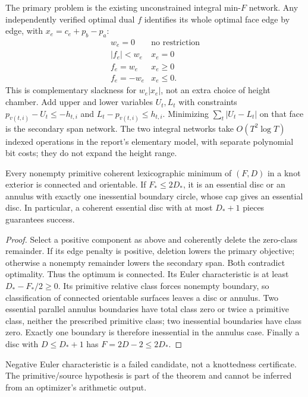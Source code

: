 The primary problem is the existing unconstrained integral min-$F$
network. Any independently verified optimal dual $f$ identifies its whole
optimal face edge by edge, with $x_e=c_e+p_b-p_a$:
\[
 \begin{array}{c|c}
 w_e=0&\text{no restriction}\\
 |f_e|<w_e&x_e=0\\
 f_e=w_e&x_e\ge0\\
 f_e=-w_e&x_e\le0.
 \end{array}
\]
This is complementary slackness for $w_e|x_e|$, not an extra choice of
height chamber. Add upper and lower variables $U_t,L_t$ with constraints
$p_{v(t,i)}-U_t\le-h_{t,i}$ and
$L_t-p_{v(t,i)}\le h_{t,i}$. Minimizing $\sum_t|U_t-L_t|$ on that
face is the secondary span network. The two integral networks take
$O(T^2\log T)$ indexed operations in the report's elementary model, with
separate polynomial bit costs; they do not expand the height range.

\begin{proposition}
Every nonempty primitive coherent lexicographic minimum of $(F,D)$ in
a knot exterior is connected and orientable. If $F_*\le2D_*$, it is an
essential disc or an annulus with exactly one inessential boundary circle,
whose cap gives an essential disc. In particular, a coherent essential
disc with at most $D_*+1$ pieces guarantees success.
\end{proposition}
\begin{proof}
Select a positive component as above and coherently delete the zero-class
remainder. If its edge penalty is positive, deletion lowers the primary
objective; otherwise a nonempty remainder lowers the secondary span.
Both contradict optimality. Thus the optimum is connected. Its Euler
characteristic is at least $D_*-F_*/2\ge0$. Its primitive relative class
forces nonempty boundary, so classification of connected orientable
surfaces leaves a disc or annulus. Two essential parallel annulus boundaries
have total class zero or twice a primitive class, neither the prescribed
primitive class; two inessential boundaries have class zero. Exactly one
boundary is therefore inessential in the annulus case. Finally a disc
with $D\le D_*+1$ has $F=2D-2\le2D_*$.
\end{proof}

Negative Euler characteristic is a failed candidate, not a knottedness
certificate. The primitive/source hypothesis is part of the theorem and
cannot be inferred from an optimizer's arithmetic output.

